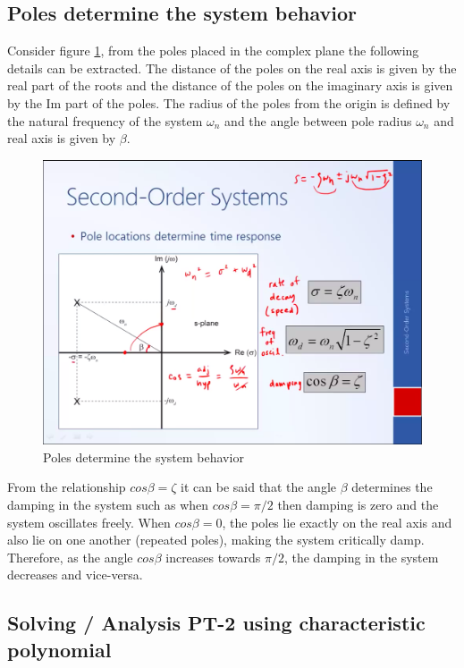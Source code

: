 \clearpage

\subsection{Poles determine the system behavior} \label{Sec_PolesDetSysBehv}

Consider figure \ref{Fig_PolesSystemBehavior}, from the poles placed in the complex plane the following details can be extracted. The distance of the poles on the real axis is given by the real part of the roots and the distance of the poles on the imaginary axis is given by the Im part of the poles. The radius of the poles from the origin is defined by the natural frequency of the system $\omega_{n}$ and the angle between pole radius $\omega_{n}$ and real axis is given by $\beta$.
\begin{figure}[h!]
	\centering
	\includegraphics[width=\linewidth]{Bilder/PolesDetermineSysBehavior}
	\caption{Poles determine the system behavior}
	\label{Fig_PolesSystemBehavior}
\end{figure}

From the relationship $cos{\beta} = \zeta$ it can be said that the angle $\beta$ determines the damping in the system such as when $cos{\beta} = \pi/2$ then damping is zero and the system oscillates freely. When $cos{\beta} = 0$, the poles lie exactly on the real axis and also lie on one another (repeated poles), making the system critically damp. Therefore, as the angle $cos{\beta}$ increases towards $\pi/2$, the damping in the system decreases and vice-versa.

\subsection{Solving / Analysis PT-2 using characteristic polynomial}

